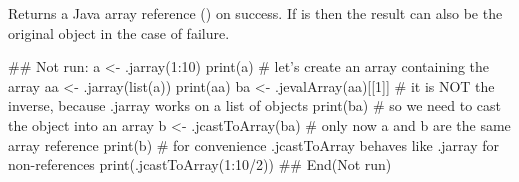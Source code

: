\begin{Value}
Returns a Java array reference () on success. If
 is  then the result can also be the original
object in the case of failure.
\end{Value}
\begin{Examples}
\begin{ExampleCode}
## Not run: 
a <- .jarray(1:10)
print(a)
# let's create an array containing the array
aa <- .jarray(list(a))
print(aa)
ba <- .jevalArray(aa)[[1]]
# it is NOT the inverse, because .jarray works on a list of objects
print(ba)
# so we need to cast the object into an array
b <- .jcastToArray(ba)
# only now a and b are the same array reference
print(b)
# for convenience .jcastToArray behaves like .jarray for non-references
print(.jcastToArray(1:10/2))
## End(Not run)
\end{ExampleCode}
\end{Examples}

